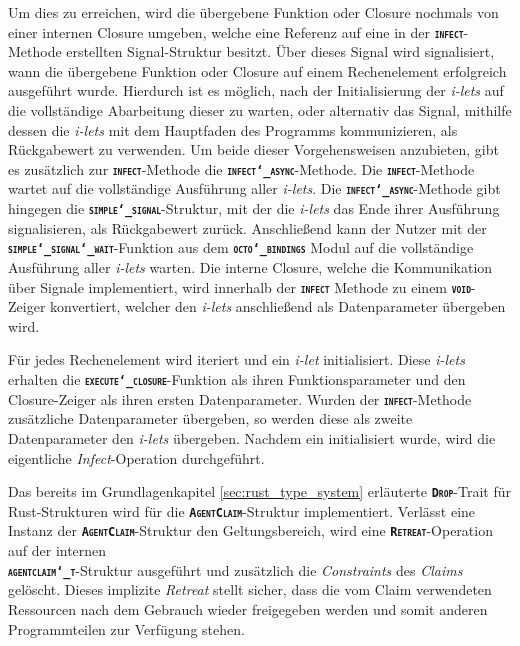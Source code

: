 Um dies zu erreichen, wird die übergebene Funktion oder Closure nochmals von einer internen Closure umgeben,
welche eine Referenz auf eine in der \texttt{\textsc{\textbf{infect}}}-Methode erstellten Signal-Struktur besitzt.
Über dieses Signal wird signalisiert, wann die übergebene Funktion oder Closure auf einem Rechenelement erfolgreich
ausgeführt wurde.
Hierdurch ist es möglich, nach der Initialisierung der \textit{i-lets} auf die
vollständige Abarbeitung dieser zu warten, oder alternativ das Signal, mithilfe dessen die \textit{i-lets} mit dem
Hauptfaden des Programms kommunizieren, als Rückgabewert zu verwenden.
Um beide dieser Vorgehensweisen anzubieten, gibt es zusätzlich zur \texttt{\textsc{\textbf{infect}}}-Methode
die \texttt{\textsc{\textbf{infect\char`_async}}}-Methode. Die \texttt{\textsc{\textbf{infect}}}-Methode wartet auf
die vollständige Ausführung aller \textit{i-lets}. Die \texttt{\textsc{\textbf{infect\char`_async}}}-Methode gibt hingegen
die \texttt{\textsc{\textbf{simple\char`_signal}}}-Struktur, mit der die \textit{i-lets} das Ende ihrer Ausführung signalisieren,
als Rückgabewert zurück.
Anschließend kann der Nutzer mit der
\texttt{\textsc{\textbf{simple\char`_signal\char`_wait}}}-Funktion aus dem
\texttt{\textsc{\textbf{octo\char`_bindings}}}
Modul auf die vollständige Ausführung aller \textit{i-lets} warten.
Die interne Closure, welche die Kommunikation über Signale implementiert, wird innerhalb der
\texttt{\textsc{\textbf{infect}}} Methode zu einem \texttt{\textsc{\textbf{void}}}-Zeiger konvertiert,
welcher den \textit{i-lets} anschließend als Datenparameter übergeben wird.

Für jedes Rechenelement wird iteriert und ein \textit{i-let} initialisiert.
Diese \textit{i-lets} erhalten die \texttt{\textsc{\textbf{execute\char`_closure}}}-Funktion als ihren
Funktionsparameter und den Closure-Zeiger als ihren ersten Datenparameter.
Wurden der \texttt{\textsc{\textbf{infect}}}-Methode zusätzliche Datenparameter
übergeben, so werden diese als zweite Datenparameter den \textit{i-lets} übergeben.
Nachdem ein  initialisiert wurde, wird die eigentliche \textit{Infect}-Operation durchgeführt.

Das bereits im Grundlagenkapitel \ref{sec:rust_type_system} erläuterte \texttt{\textsc{\textbf{Drop}}}-Trait für Rust-Strukturen wird für die
\texttt{\textsc{\textbf{AgentClaim}}}-Struktur implementiert.
Verlässt eine Instanz der \texttt{\textsc{\textbf{AgentClaim}}}-Struktur den Geltungsbereich, wird eine
\texttt{\textsc{\textbf{Retreat}}}-Operation auf der internen \\
\texttt{\textsc{\textbf{agentclaim\char`_t}}}-Struktur ausgeführt und zusätzlich
die \textit{Constraints} des \textit{Claims} gelöscht. Dieses implizite \textit{Retreat}
stellt sicher, dass die vom Claim verwendeten Ressourcen nach dem Gebrauch wieder freigegeben werden und
somit anderen Programmteilen zur Verfügung stehen.
